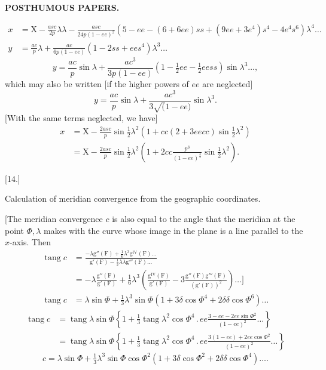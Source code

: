 \par\clearpage
\noindent{}\hfill{\small\textbf{POSTHUMOUS PAPERS.}}\hfill\null\par\medskip

\noindent [or alternatively]
\[
\begin{aligned}
x&=\mathrm X-\frac{asc}{2p}\lambda\lambda-\frac{asc}{24p(1-ee)^2}
 (5-ee-(6+6ee)ss+(9ee+3e^4)s^4-4e^4s^6)\lambda^4\ldots\\
y&=\frac{ac}{p}\lambda+\frac{ac}{6p(1-ee)}(1-2ss+ees^4)\lambda^3\ldots
\end{aligned}
\]
\noindent [or]
\[
y=\frac{ac}{p}\sin\lambda+\frac{ac^3}{3p(1-ee)}
 (1-\tfrac12ee-\tfrac12eess)\sin\lambda^3\ldots,
\]
\noindent which may also be written [if the higher powers of \(ee\) are neglected]
\[
y=\frac{ac}{p}\sin\lambda+\frac{ac^3}{3\surd(1-ee)}\sin\lambda^3.
\]
[With the same terms neglected, we have]
\[
\begin{aligned}
x&=\mathrm X-\frac{2asc}{p}\sin\tfrac12\lambda^2
 \left(1+cc(2+3eecc)\sin\tfrac12\lambda^2\right)\\
 &=\mathrm X-\frac{2asc}{p}\sin\tfrac12\lambda^2
 \left(1+2cc\frac{p^3}{(1-ee)^{\frac32}}\sin\tfrac12\lambda^2\right).
\end{aligned}
\]

\begin{center}
[14.]\par\medskip
Calculation of meridian convergence from the geographic coordinates.
\end{center}
[The meridian convergence \(c\) is also equal to the angle that the meridian at the point
\(\Phi,\lambda\) makes with the curve whose image in the plane is a line parallel
to the \(x\)-axis. Then
\[
\begin{aligned}
\operatorname{tang}c&=\frac{-\lambda\mathrm g''(\mathrm F)+\tfrac16\lambda^3\mathrm g^{\mathrm{IV}}(\mathrm F)\ldots}
 {\mathrm g'(\mathrm F)-\tfrac12\lambda\lambda\mathrm g'''(\mathrm F)\ldots}\\
 &=-\lambda\frac{\mathrm g''(\mathrm F)}{\mathrm g'(\mathrm F)}
 +\tfrac16\lambda^3\left(\frac{\mathrm g^{\mathrm{IV}}(\mathrm F)}{\mathrm g'(\mathrm F)}
 -3\frac{\mathrm g''(\mathrm F)\mathrm g'''(\mathrm F)}{(\mathrm g'(\mathrm F))^2}\right)\ldots\mathclose{]}\\
\operatorname{tang}c&=\lambda\sin\Phi+\tfrac13\lambda^3\sin\Phi
 (1+3\delta\cos\Phi^4+2\delta\delta\cos\Phi^6)\ldots
\end{aligned}
\]
\noindent [or]
\[
\begin{aligned}
\operatorname{tang}c&=\operatorname{tang}\lambda\sin\Phi
 \left\{1+\tfrac13\operatorname{tang}\lambda^2\cos\Phi^4\,.\,ee
 \frac{3-ee-2ee\sin\Phi^2}{(1-ee)^2}\ldots\right\}\\
 &=\operatorname{tang}\lambda\sin\Phi
 \left\{1+\tfrac13\operatorname{tang}\lambda^2\cos\Phi^4\,.\,ee
 \frac{3(1-ee)+2ee\cos\Phi^2}{(1-ee)^2}\ldots\right\}
\end{aligned}
\]
\noindent [or alternatively]
\[
c=\lambda\sin\Phi+\tfrac13\lambda^3\sin\Phi\cos\Phi^2
 (1+3\delta\cos\Phi^2+2\delta\delta\cos\Phi^4)\ldots.
\]

